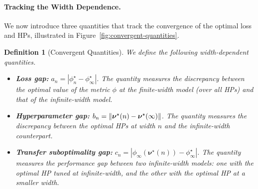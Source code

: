 \documentclass{article} %
\newtheorem{definition}{Definition}
\newcommand{\bhp}{\bm{\nu}}                       %
\begin{document}
\paragraph{Tracking the Width Dependence.}
We now introduce three quantities that track the convergence of the optimal loss and HPs, illustrated in Figure~\ref{fig:convergent-quantities}.

\begin{definition}[Convergent Quantities] \label{def:convergent_quantities}
We define the following width-dependent quantities.
    \begin{itemize}[leftmargin=*,itemsep=0.2mm,topsep=0.2mm] 
    \item \textbf{Loss gap:} $a_n = |\phi_n^\star - \phi_\infty^\star|$. The quantity measures the discrepancy between the optimal value of the metric $\phi$ at the finite-width model (over all HPs) and that of the infinite-width model.
    \item \textbf{Hyperparameter gap:} $b_n = \norm{\bhp^\star(n) - \bhp^\star(\infty)}$. The quantity measures the discrepancy between the optimal HPs at width $n$ and the infinite-width counterpart.
    
    \item \textbf{Transfer suboptimality gap:} $c_n = |\phi_\infty(\bhp^\star(n)) - \phi_\infty^\star|$. The quantity measures the performance gap between two infinite-width models: one with the optimal HP tuned at infinite-width, and the other with the optimal HP at a smaller width. 
\end{itemize}
\end{definition} 
\end{document}
